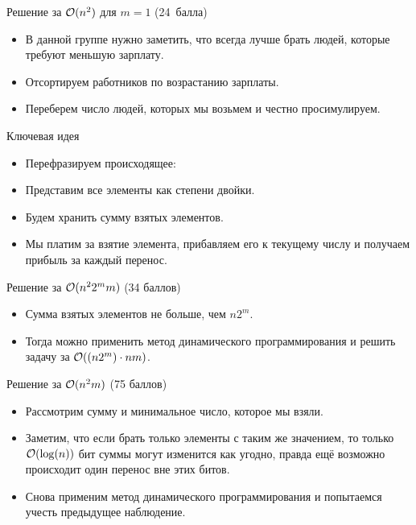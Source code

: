\begin{frame}{Решение за $\mathcal{O}(n^2)$ для $m = 1$ (24~балла)}
  \begin{itemize}
  \item В данной группе нужно заметить, что всегда лучше брать людей, которые требуют меньшую зарплату.
  \item Отсортируем работников по возрастанию зарплаты.
  \item Переберем число людей, которых мы возьмем и честно просимулируем.
  \end{itemize}
\end{frame}

\begin{frame}{Ключевая идея}
  \begin{itemize}
  \item Перефразируем происходящее:
  \item Представим все элементы как степени двойки.
  \item Будем хранить сумму взятых элементов.
  \item Мы платим за взятие элемента, прибавляем его к текущему числу и получаем прибыль за каждый перенос.
  \end{itemize}
\end{frame}

\begin{frame}{Решение за $\mathcal{O}(n^22^mm)$ (34 баллов)}
  \begin{itemize}
  \item Сумма взятых элементов не больше, чем $n2^m$.
  \item Тогда можно применить метод динамического программирования и
  решить задачу за $\mathcal{O}((n 2^m) \cdot n m)$.
  \end{itemize}
\end{frame}

\begin{frame}{Решение за $\mathcal{O}(n^2m)$ (75 баллов)}
  \begin{itemize}
  \item Рассмотрим сумму и минимальное число, которое мы взяли.
  \item Заметим, что если брать только элементы с таким же значением, то только $\mathcal{O}(\log(n))$ бит суммы могут изменится как угодно, правда ещё возможно происходит один перенос вне этих битов.
  \item Снова применим метод динамического программирования и попытаемся учесть предыдущее наблюдение.
  \end{itemize}
\end{frame}

